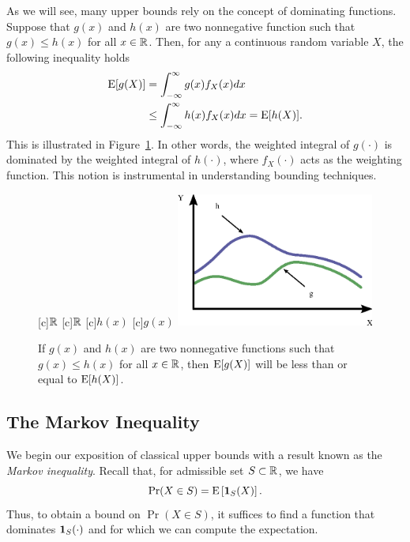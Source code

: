 As we will see, many upper bounds rely on the concept of dominating functions.
Suppose that $g(x)$ and $h(x)$ are two nonnegative function such that $g(x) \leq h(x)$ for all $x \in \mathbb{R}$.
Then, for any a continuous random variable $X$, the following inequality holds
\begin{equation*}
\begin{split}
\mathrm{E} [g(X)] &= \int_{-\infty}^{\infty} g(x) f_X(x) dx \\
&\leq \int_{-\infty}^{\infty} h(x) f_X (x) dx
= \mathrm{E} [h(X)] .
\end{split}
\end{equation*}
This is illustrated in Figure~\ref{figure:DominatingFcn}.
In other words, the weighted integral of $g(\cdot)$ is dominated by the weighted integral of $h(\cdot)$, where $f_X (\cdot)$ acts as the weighting function.
This notion is instrumental in understanding bounding techniques.
\begin{figure}[thb]
\begin{center}
\begin{psfrags}
[c]{$\mathbb{R}$}
[c]{$\mathbb{R}$}
[c]{$h(x)$}
[c]{$g(x)$}
\includegraphics[width=6.5cm]{Figures/10Chapter/DominatingFcn}
\end{psfrags}
\caption{If $g(x)$ and $h(x)$ are two nonnegative functions such that $g(x) \leq h(x)$ for all $x \in \mathbb{R}$, then $\mathrm{E} [g (X)]$ will be less than or equal to $\mathrm{E} [h(X)]$.}
\label{figure:DominatingFcn}
\end{center}
\end{figure}


\subsection{The Markov Inequality}

We begin our exposition of classical upper bounds with a result known as the \emph{Markov inequality}. 
Recall that, for admissible set $S \subset \mathbb{R}$, we have
\begin{equation*}
\Pr (X \in S) = \mathrm{E} \left[ \mathbf{1}_S (X) \right] .
\end{equation*}
Thus, to obtain a bound on $\Pr (X \in S)$, it suffices to find a function that dominates $\mathbf{1}_S (\cdot)$ and for which we can compute the expectation.

